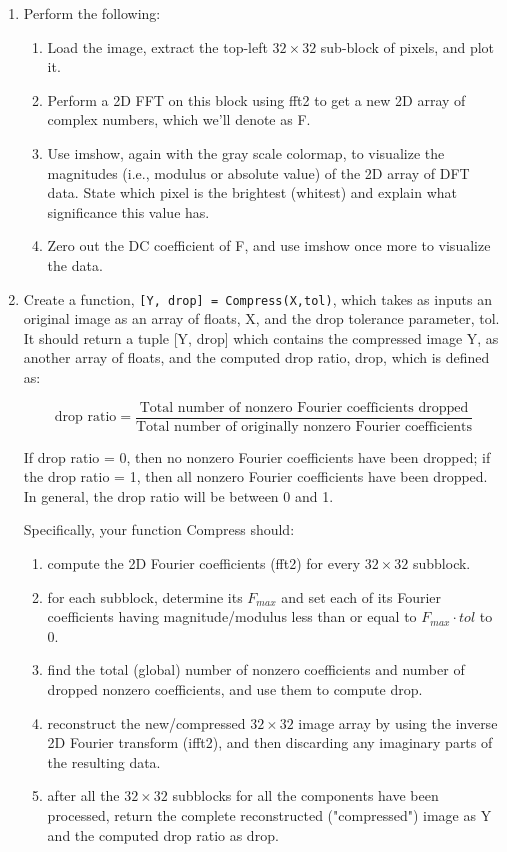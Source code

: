 \documentclass[11pt]{article}
\begin{document}
\begin{enumerate}
  \item Perform the following:
  
  \begin{enumerate}
    \item Load the image, extract the top-left $32 \times 32$ sub-block of pixels, and plot it.
    \item Perform a 2D FFT on this block using fft2 to get a new 2D array of complex
    numbers, which we'll denote as F.
    \item Use imshow, again with the gray scale colormap, to visualize the magnitudes (i.e.,
    modulus or absolute value) of the 2D array of DFT data. State which pixel is the brightest (whitest) and explain what significance this value has.
    \item Zero out the DC coefficient of F, and use imshow once more to visualize the data.
  \end{enumerate}

  \item Create a function, \texttt{[Y, drop] = Compress(X,tol)}, which takes as inputs an original image as an array of floats, X, and the drop tolerance parameter, tol. It should return a tuple [Y, drop] which contains the compressed image Y, as another array of floats, and the computed drop ratio, drop, which is defined as:

  \[ \text{drop ratio} = \dfrac{\text{Total number of nonzero Fourier coefficients dropped}}{\text{Total number of originally nonzero Fourier coefficients}} \]

  If drop ratio = 0, then no nonzero Fourier coefficients have been dropped; if the drop ratio = 1, then all nonzero Fourier coefficients have been dropped. In general, the drop ratio will be between 0 and 1.

  Specifically, your function Compress should:
  \begin{enumerate}
    \item compute the 2D Fourier coefficients (fft2) for every $32 \times 32$ subblock.
    \item for each subblock, determine its $F_{max}$ and set each of its Fourier coefficients having
    magnitude/modulus less than or equal to $F_{max} \cdot tol$ to 0.
    \item find the total (global) number of nonzero coefficients and number of dropped nonzero
coefficients, and use them to compute drop.
    \item reconstruct the new/compressed $32 \times 32$ image array by using the inverse 2D Fourier
    transform (ifft2), and then discarding any imaginary parts of the resulting data.
    \item after all the $32 \times 32$ subblocks for all the components have been processed, return the complete reconstructed ("compressed") image as Y and the computed drop ratio as drop.
  \end{enumerate}


\end{enumerate}
\end{document}
